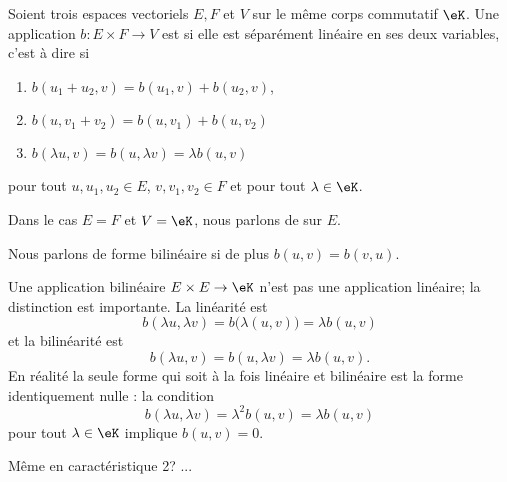 \begin{definition}      \label{DEFooEEQGooNiPjHz}
    Soient trois espaces vectoriels \( E,F\) et \( V\) sur le même corps commutatif \( \eK\). Une application \( b\colon E\times F\to V\) est  si elle est séparément linéaire en ses deux variables, c'est à dire si
    \begin{enumerate}
        \item 
            \( b(u_1+u_2,v)=b(u_1,v)+b(u_2,v)\),
        \item
            \( b(u,v_1+v_2)=b(u,v_1)+b(u,v_2)\)
        \item
            \( b(\lambda u,v)=b(u,\lambda v)=\lambda b(u,v)\)
    \end{enumerate}
    pour tout \( u,u_1,u_2\in E\), \( v,v_1,v_2\in F\) et pour tout \( \lambda\in \eK\).

    Dans le cas \( E=F\) et \( V=\eK\), nous parlons de  sur \( E\).

    Nous parlons de forme bilinéaire  si de plus \( b(u,v)=b(v,u)\).
\end{definition}

\begin{normaltext}
    Une application bilinéaire \( E\times E\to \eK\) n'est pas une application linéaire; la distinction est importante. La linéarité est
    \begin{equation}
        b(\lambda u,\lambda v)= b\big( \lambda(u,v) \big)=\lambda b(u,v)
    \end{equation}
    et la bilinéarité est
    \begin{equation}
        b(\lambda u,v)=b(u,\lambda v)=\lambda b(u,v).
    \end{equation}
    En réalité la seule forme qui soit à la fois linéaire et bilinéaire est la forme identiquement nulle : la condition
    \begin{equation}
        b(\lambda u,\lambda v)=\lambda^2b(u,v)=\lambda b(u,v)
    \end{equation}
    pour tout \( \lambda\in \eK\) implique \( b(u,v)=0\).
\end{normaltext}

\begin{probleme}        \label{PROPBooRWFCooLwIcAF}
Même en caractéristique 2? ...
\end{probleme}


